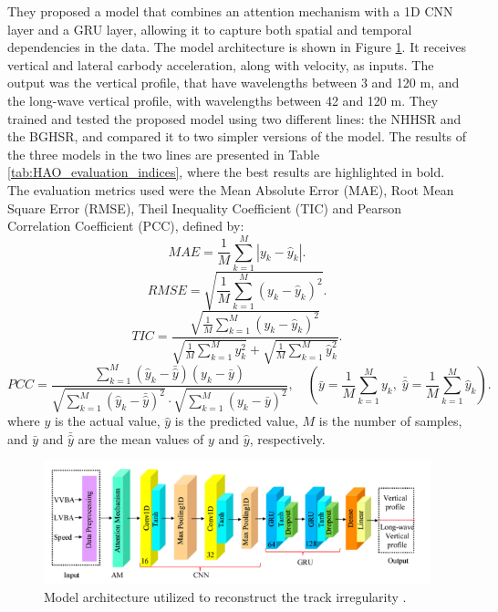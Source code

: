 They proposed a model that combines an attention mechanism with a 1D CNN layer and a GRU layer, allowing it to capture both spatial and temporal dependencies in the data. The model architecture is shown in Figure \ref{fig:Hao_model}. It receives vertical and lateral carbody acceleration, along with velocity, as inputs. The output was the vertical profile, that have wavelengths between 3 and 120 m, and the long-wave vertical profile, with wavelengths between 42 and 120 m. They trained and tested the proposed model using two different lines: the NHHSR and the BGHSR, and compared it to two simpler versions of the model. The results of the three models in the two lines are presented in Table \ref{tab:HAO_evaluation_indices}, where the best results are highlighted in bold. The evaluation metrics used were the Mean Absolute Error (MAE), Root Mean Square Error (RMSE), Theil Inequality Coefficient (TIC) and Pearson Correlation Coefficient (PCC), defined by:
\begin{equation}
MAE = \frac{1}{M} \sum_{k=1}^{M} \left| y_k - \hat{y}_k \right|.
\end{equation}
\begin{equation}
RMSE = \sqrt{ \frac{1}{M} \sum_{k=1}^{M} \left( y_k - \hat{y}_k \right)^2 }.
\end{equation}
\begin{equation}
TIC = \frac{ \sqrt{ \frac{1}{M} \sum_{k=1}^{M} \left( y_k - \hat{y}_k \right)^2 } }
{ \sqrt{ \frac{1}{M} \sum_{k=1}^{M} y_k^2 } + \sqrt{ \frac{1}{M} \sum_{k=1}^{M} \hat{y}_k^2 } }.
\end{equation}
\begin{equation}
PCC = \frac{ \sum_{k=1}^{M} \left( \hat{y}_k - \bar{\hat{y}} \right) \left( y_k - \bar{y} \right) }
{ \sqrt{ \sum_{k=1}^{M} \left( \hat{y}_k - \bar{\hat{y}} \right)^2 } 
\cdot \sqrt{ \sum_{k=1}^{M} \left( y_k - \bar{y} \right)^2 } },
\quad \left( \bar{y} = \frac{1}{M} \sum_{k=1}^{M} y_k, \;
\bar{\hat{y}} = \frac{1}{M} \sum_{k=1}^{M} \hat{y}_k \right).
\end{equation}
where $y$ is the actual value, $\hat{y}$ is the predicted value, $M$ is the number of samples, and $\bar{y}$ and $\bar{\hat{y}}$ are the mean values of $y$ and $\hat{y}$, respectively.

\begin{figure}[H]
    \centering
    \includegraphics[width=12cm]{Cap2_LitReview/Track_Quality_Accel/Hao (2023)/Model_arch.png}
    \caption{Model architecture utilized to reconstruct the track irregularity \cite{Hao02012023}.}
    \label{fig:Hao_model}
\end{figure}

